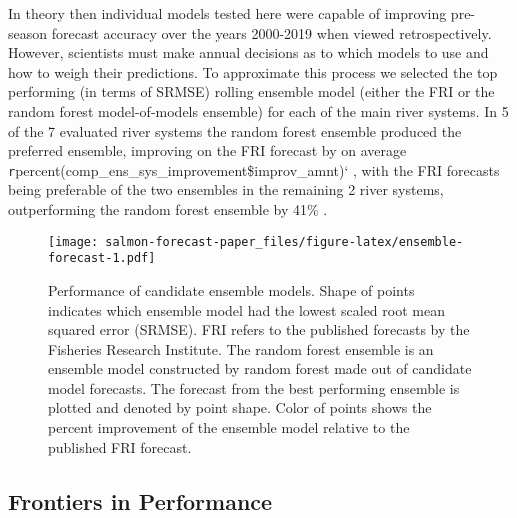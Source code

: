 \documentclass[
]{article}
\begin{document}
In theory then individual models tested here were capable of improving pre-season forecast accuracy over the years 2000-2019 when viewed retrospectively. However, scientists must make annual decisions as to which models to use and how to weigh their predictions. To approximate this process we selected the top performing (in terms of SRMSE) rolling ensemble model (either the FRI or the random forest model-of-models ensemble) for each of the main river systems. In 5 of the 7 evaluated river systems the random forest ensemble produced the preferred ensemble, improving on the FRI forecast by on average \texttt{r}percent(comp\_ens\_sys\_improvement\$improv\_amnt)` , with the FRI forecasts being preferable of the two ensembles in the remaining 2 river systems, outperforming the random forest ensemble by 41\% .

\begin{figure}
\centering
\texttt{[image: salmon-forecast-paper\_files/figure-latex/ensemble-forecast-1.pdf]}
\caption{\label{fig:ensemble-forecast}Performance of candidate ensemble models. Shape of points indicates which ensemble model had the lowest scaled root mean squared error (SRMSE). FRI refers to the published forecasts by the Fisheries Research Institute. The random forest ensemble is an ensemble model constructed by random forest made out of candidate model forecasts. The forecast from the best performing ensemble is plotted and denoted by point shape. Color of points shows the percent improvement of the ensemble model relative to the published FRI forecast.}
\end{figure}

\hypertarget{frontiers-in-performance}{%
\subsection*{Frontiers in Performance}\label{frontiers-in-performance}}
\end{document}
